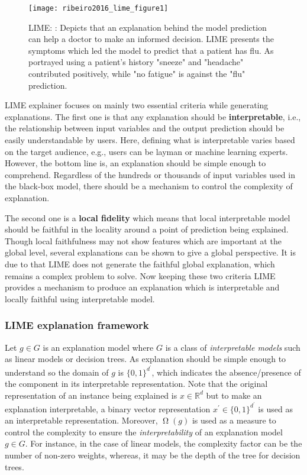 \documentclass[english]{tktltiki2}
\theoremstyle{definition}
\theoremstyle{remark}
\begin{document}
\begin{figure}[H]
	\texttt{[image: ribeiro2016\_lime\_figure1]}
	\vspace*{-10mm}
	\caption{LIME: \citep{ribeiro2016should}: Depicts that an explanation behind the model prediction can help a doctor to make an informed decision. LIME presents the symptoms which led the model to predict that a patient has flu. As portrayed using a patient's history "sneeze" and "headache" contributed positively, while "no fatigue" is against the "flu" prediction. }
	\label{fig:ribeiro2016_lime_figure1}
\end{figure}

LIME \citep{ribeiro2016should} explainer focuses on mainly two essential criteria while generating explanations. The first one is that any explanation should be \textbf{interpretable}, i.e., the relationship between input variables and the output prediction should be easily understandable by users. Here, defining what is interpretable varies based on the target audience, e.g., users can be layman or machine learning experts. However, the bottom line is, an explanation should be simple enough to comprehend. Regardless of the hundreds or thousands of input variables used in the black-box model, there should be a mechanism to control the complexity of explanation.

The second one is a \textbf{local fidelity} which means that local interpretable model should be faithful in the locality around a point of prediction being explained. Though local faithfulness may not show features which are important at the global level, several explanations can be shown to give a global perspective. It is due to that LIME does not generate the faithful global explanation, which remains a complex problem to solve. Now keeping these two criteria LIME \citep{ribeiro2016should} provides a mechanism to produce an explanation which is interpretable and locally faithful using interpretable model.

\subsubsection{LIME explanation framework} %
Let $g \in G$ is an explanation model where $G$ is a class of \textit{interpretable models} such as linear models or decision trees. As explanation should be simple enough to understand so the domain of  $g$ is $\{0, 1\}^{d^\prime}$, which indicates the absence/presence of the component in its interpretable representation. Note that the original representation of an instance being explained is $x \in \mathbb{R}^d$ but to make an explanation interpretable, a binary vector representation $x^\prime \in \{0, 1\}^{d^\prime}$ is used as an interpretable representation. Moreover, $\upOmega(g)$ is used as a measure to control the complexity to ensure the \textit{interpretability} of an explanation model $g \in G$. For instance, in the case of linear models, the complexity factor can be the number of non-zero weights, whereas, it may be the depth of the tree for decision trees.
\end{document}
